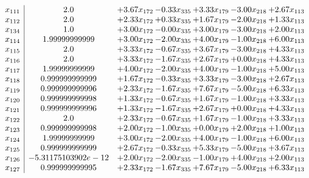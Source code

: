 \documentclass[8pt]{article}
\begin{document}
\[\begin{array}{c| c c@{\hskip 2pt} c@{\hskip 2pt} c@{\hskip 2pt} c@{\hskip 2pt} c@{\hskip 2pt} }
 x_{111}   &  2.0 & +  3.67 x_{172} & -0.33 x_{335} & +  3.33 x_{179} & -3.00 x_{218} & +  2.67 x_{113}\\
 x_{112}   &  2.0 & +  2.33 x_{172} & +  0.33 x_{335} & +  1.67 x_{179} & -2.00 x_{218} & +  1.33 x_{113}\\
 x_{134}   &  1.0 & +  3.00 x_{172} & -0.00 x_{335} & +  3.00 x_{179} & -3.00 x_{218} & +  2.00 x_{113}\\
 x_{114}   &  1.99999999999 & +  3.00 x_{172} & -2.00 x_{335} & +  4.00 x_{179} & -1.00 x_{218} & +  6.00 x_{113}\\
 x_{115}   &  2.0 & +  3.33 x_{172} & -0.67 x_{335} & +  3.67 x_{179} & -3.00 x_{218} & +  4.33 x_{113}\\
 x_{116}   &  2.0 & +  3.33 x_{172} & -1.67 x_{335} & +  2.67 x_{179} & +  0.00 x_{218} & +  4.33 x_{113}\\
 x_{117}   &  1.99999999999 & +  4.00 x_{172} & -2.00 x_{335} & +  4.00 x_{179} & -1.00 x_{218} & +  5.00 x_{113}\\
 x_{118}   &  0.999999999999 & +  1.67 x_{172} & -0.33 x_{335} & +  3.33 x_{179} & -3.00 x_{218} & +  2.67 x_{113}\\
 x_{119}   &  0.999999999996 & +  2.33 x_{172} & -1.67 x_{335} & +  7.67 x_{179} & -5.00 x_{218} & +  6.33 x_{113}\\
 x_{120}   &  0.999999999998 & +  1.33 x_{172} & -0.67 x_{335} & +  1.67 x_{179} & -1.00 x_{218} & +  3.33 x_{113}\\
 x_{121}   &  0.999999999996 & +  1.33 x_{172} & -1.67 x_{335} & +  2.67 x_{179} & +  0.00 x_{218} & +  4.33 x_{113}\\
 x_{122}   &  2.0 & +  2.33 x_{172} & -0.67 x_{335} & +  1.67 x_{179} & -1.00 x_{218} & +  3.33 x_{113}\\
 x_{123}   &  0.999999999998 & +  2.00 x_{172} & -1.00 x_{335} & +  0.00 x_{179} & +  2.00 x_{218} & +  1.00 x_{113}\\
 x_{124}   &  1.99999999999 & +  3.00 x_{172} & -2.00 x_{335} & +  4.00 x_{179} & -1.00 x_{218} & +  6.00 x_{113}\\
 x_{125}   &  0.999999999999 & +  2.67 x_{172} & -0.33 x_{335} & +  5.33 x_{179} & -5.00 x_{218} & +  3.67 x_{113}\\
 x_{126}   &  -5.31175103902e-12 & +  2.00 x_{172} & -2.00 x_{335} & -1.00 x_{179} & +  4.00 x_{218} & +  2.00 x_{113}\\
 x_{127}   &  0.999999999995 & +  2.33 x_{172} & -1.67 x_{335} & +  7.67 x_{179} & -5.00 x_{218} & +  6.33 x_{113}\\

\end{array}\]
\end{document}
